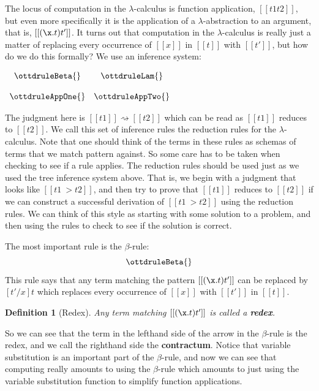 \documentclass{article}
\newtheorem{definition}[thm]{Definition}
\begin{document}
The locus of computation in the $\lambda$-calculus is function
application, $[[t1 t2]]$, but even more specifically it is the
application of a $\lambda$-abstraction to an argument, that is,
$[[(\x.t) t']]$.  It turns out that computation in the
$\lambda$-calculus is really just a matter of replacing every
occurrence of $[[x]]$ in $[[t]]$ with $[[t']]$, but how do we do this
formally?  We use an inference system:
\begin{center}
  \begin{math}
    \begin{array}{cc}
      \ottdruleBeta{} &      \ottdruleLam{}  \\
      & \\
      \ottdruleAppOne{} &       \ottdruleAppTwo{}\\
    \end{array}
  \end{math}
\end{center}
The judgment here is $[[t1]] \rightsquigarrow [[t2]]$ which can be
read as $[[t1]]$ reduces to $[[t2]]$.  We call this set of inference
rules the reduction rules for the $\lambda$-calculus.  Note that one
should think of the terms in these rules as schemas of terms that we
match pattern against.  So some care has to be taken when checking to
see if a rule applies.  The reduction rules should be used just as we
used the tree inference system above.  That is, we begin with a
judgment that looks like $[[t1 ~> t2]]$, and then try to prove that
$[[t1]]$ reduces to $[[t2]]$ if we can construct a successful
derivation of $[[t1 ~> t2]]$ using the reduction rules.  We can think
of this style as starting with some solution to a problem, and then
using the rules to check to see if the solution is correct.

The most important rule is the $\beta$-rule:
\[\ottdruleBeta{} \]
This rule says that any term matching the pattern $[[(\x.t) t']]$ can
be replaced by $[t'/x]t$ which replaces every occurrence of $[[x]]$
with $[[t']]$ in $[[t]]$. 
\vspace{10px}
\begin{definition}[Redex]
  \label{def:redex}
  Any term matching $[[(\x.t) t']]$ is called a \textbf{redex}.
\end{definition}
So we can see that the term in the lefthand side of the arrow in the
$\beta$-rule is the redex, and we call the righthand side the
\textbf{contractum}.  Notice that variable substitution is an
important part of the $\beta$-rule, and now we can see that computing
really amounts to using the $\beta$-rule which amounts to just using
the variable substitution function to simplify function applications.
\end{document}
